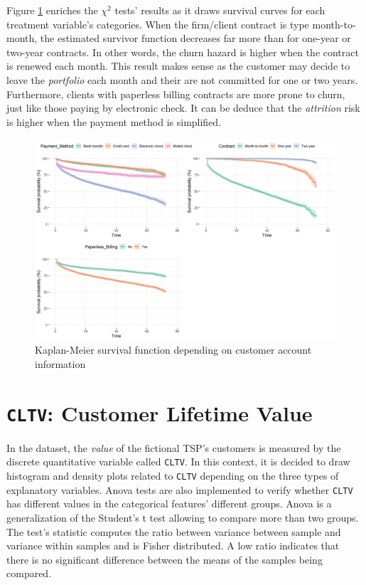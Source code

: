 \documentclass[
]{book}
\begin{document}
Figure \ref{fig:kmcustaccount} enriches the \(\chi^2\) tests' results as it draws survival curves for each treatment variable's categories. When the firm/client contract is type month-to-month, the estimated survivor function decreases far more than for one-year or two-year contracts. In other words, the churn hazard is higher when the contract is renewed each month. This result makes sense as the customer may decide to leave the \emph{portfolio} each month and their are not committed for one or two years. Furthermore, clients with paperless billing contracts are more prone to churn, just like those paying by electronic check. It can be deduce that the \emph{attrition} risk is higher when the payment method is simplified.

\begin{figure}

{\centering \includegraphics[width=50in]{./imgs/account_info_plot} 

}

\caption{Kaplan-Meier survival function depending on customer account information}\label{fig:kmcustaccount}
\end{figure}

\hypertarget{cltv-customer-lifetime-value}{%
\section{\texorpdfstring{\texttt{CLTV}: Customer Lifetime Value}{CLTV: Customer Lifetime Value}}\label{cltv-customer-lifetime-value}}

In the dataset, the \emph{value} of the fictional TSP's customers is measured by the discrete quantitative variable called \texttt{CLTV}. In this context, it is decided to draw histogram and density plots related to \texttt{CLTV} depending on the three types of explanatory variables. Anova tests are also implemented to verify whether \texttt{CLTV} has different values in the categorical features' different groups. Anova is a generalization of the Student's t test allowing to compare more than two groups. The test's statistic computes the ratio between variance between sample and variance within samples and is Fisher distributed. A low ratio indicates that there is no significant difference between the means of the samples being compared.
\end{document}
